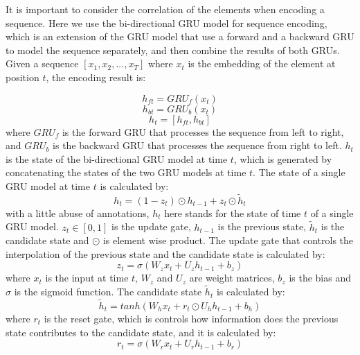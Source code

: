 It is important to consider the correlation of the elements when encoding a sequence. Here we use the bi-directional GRU model  for sequence encoding, which is an extension of the GRU model \cite{cho2014learning} that use a forward and a backward GRU to model the sequence separately, and then combine the results of both GRUs. Given a sequence $[x_1, x_2, ..., x_T]$ where $x_t$ is the embedding of the element at position $t$, the encoding result is:

\begin{equation}
h_{ft} = GRU_f(x_{t})
\end{equation}
\begin{equation}
h_{bt} = GRU_b(x_{t})
\end{equation}
\begin{equation}
h_t = [h_{ft}, h_{bt}]
\end{equation}
where $GRU_f$ is the forward GRU that processes the sequence from left to right, and $GRU_b$ is the backward GRU that processes the sequence from right to left. $h_t$ is the state of the bi-directional GRU model at time $t$, which is generated by concatenating the states of the two GRU models at time $t$. The state of a single GRU model at time $t$ is calculated by: 
\begin{equation}
h_t=(1-z_t)\odot h_{t-1} + z_t\odot \tilde{h}_{t}
\end{equation}
with a little abuse of annotations, $h_t$ here stands for the state of time $t$ of a single GRU model. $z_t\in{[0,1]}$ is the update gate, $h_{t-1}$ is the previous state, $\tilde{h}_{t}$ is the candidate state and $\odot$ is element wise product. The update gate that controls the interpolation of the previous state and the candidate state is calculated by:
 \begin{equation}
z_t=\sigma(W_z x_t+U_z h_{t-1} + b_z)
\end{equation}
where $x_t$ is the input at time $t$, $W_z$ and $U_z$ are weight matrices, $b_z$ is the bias and $\sigma$ is the sigmoid function. The candidate state $\tilde{h}_{t}$ is calculated by:
\begin{equation}
\tilde{h}_{t}=tanh(W_h x_t + r_t\odot U_h h_{t-1} + b_h)
\end{equation}
where $r_t$ is the reset gate, which is controls how information does the previous state contributes to the candidate state, and it is calculated by:
\begin{equation}
r_t=\sigma(W_r x_t + U_r h_{t-1} + b_r)
\end{equation}



